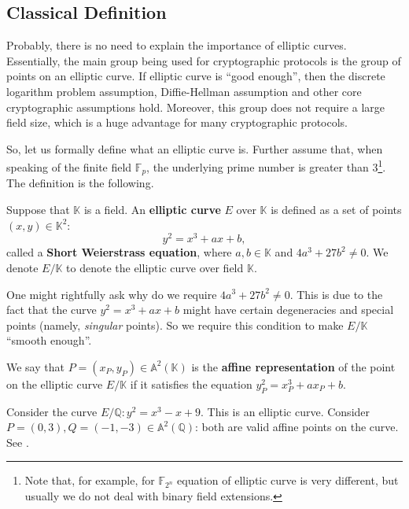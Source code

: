 \documentclass[../../book.tex]{subfiles}
\begin{document}
\subsection{Classical Definition}

Probably, there is no need to explain the importance of elliptic curves.
Essentially, the main group being used for cryptographic protocols is the group
of points on an elliptic curve. If elliptic curve is ``good enough'', then the
discrete logarithm problem assumption, Diffie-Hellman assumption and other core
cryptographic assumptions hold. Moreover, this group does not require a large
field size, which is a huge advantage for many cryptographic protocols.

So, let us formally define what an elliptic curve is. Further assume that, when speaking of the finite field $\mathbb{F}_p$, the underlying prime number is greater than $3$\footnote{Note that, for example, for $\mathbb{F}_{2^n}$ equation of elliptic curve is very different, but usually we do not deal with binary field extensions.}. The definition is the following.

\begin{definition}
    Suppose that $\mathbb{K}$ is a field. An \textbf{elliptic curve} $E$ over $\mathbb{K}$ is defined as a set of points $(x,y) \in \mathbb{K}^2$:
    \begin{equation*}
        y^2 = x^3+ax+b,
    \end{equation*}
    called a \textbf{Short Weierstrass equation}, where $a,b \in \mathbb{K}$ and $4a^3+27b^2 \neq 0$. We denote $E/\mathbb{K}$ to denote the elliptic curve over field $\mathbb{K}$.
\end{definition}

\begin{remark}
    One might rightfully ask why do we require $4a^3+27b^2 \neq 0$. This is due to the fact that the curve $y^2=x^3+ax+b$ might have certain degeneracies and special points (namely, \textit{singular} points). So we require this condition to make $E/\mathbb{K}$ ``smooth enough''.
\end{remark}

\begin{definition}
    We say that $P=(x_P,y_P) \in \mathbb{A}^2(\mathbb{K})$ is the \textbf{affine representation} of the point on the elliptic curve $E/\mathbb{K}$ if it satisfies the equation $y_P^2=x_P^3+ax_P+b$.
\end{definition}

\begin{example}
    Consider the curve $E/\mathbb{Q}: y^2=x^3-x+9$. This is an elliptic curve. Consider $P=(0,3), Q=(-1,-3) \in \mathbb{A}^2(\mathbb{Q})$: both are valid affine points on the curve. See .
\end{example}
\end{document}
